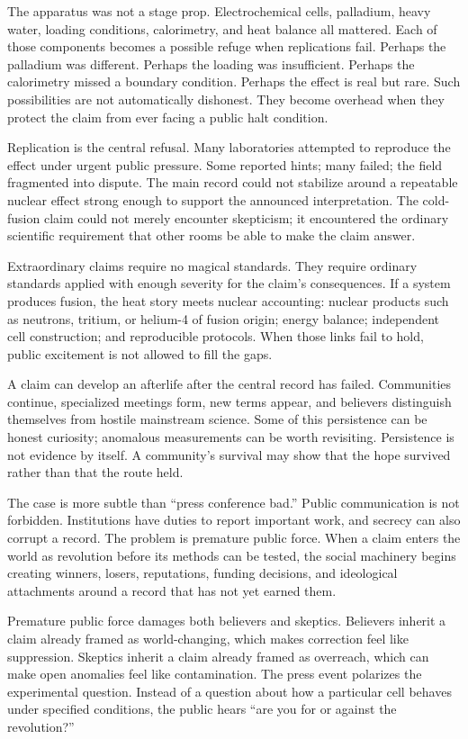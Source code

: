 The apparatus was not a stage prop. Electrochemical cells, palladium,
heavy water, loading conditions, calorimetry, and heat balance all
mattered. Each of those components becomes a possible refuge when
replications fail. Perhaps the palladium was different. Perhaps the
loading was insufficient. Perhaps the calorimetry missed a boundary
condition. Perhaps the effect is real but rare. Such possibilities are
not automatically dishonest. They become overhead when they protect the
claim from ever facing a public halt condition.

Replication is the central refusal. Many laboratories attempted to
reproduce the effect under urgent public pressure. Some reported hints;
many failed; the field fragmented into dispute. The main record could
not stabilize around a repeatable nuclear effect strong enough to support
the announced interpretation. The cold-fusion claim could not merely
encounter skepticism; it encountered the ordinary scientific requirement
that other rooms be able to make the claim answer.

Extraordinary claims require no magical standards. They require ordinary
standards applied with enough severity for the claim's consequences. If a
system produces fusion, the heat story meets nuclear accounting:
nuclear products such as neutrons, tritium, or helium-4 of fusion origin;
energy balance; independent cell construction; and reproducible
protocols. When those links fail to hold, public excitement is not
allowed to fill the gaps.

A claim can develop an afterlife after the central record has failed.
Communities continue, specialized meetings form, new terms appear, and
believers distinguish themselves from hostile mainstream science. Some of
this persistence can be honest curiosity; anomalous measurements can be
worth revisiting. Persistence is not evidence by itself. A community's
survival may show that the hope survived rather than that the route
held.

The case is more subtle than ``press conference bad.'' Public
communication is not forbidden. Institutions have duties to report
important work, and secrecy can also corrupt a record. The problem is
premature public force. When a claim enters the world as revolution before
its methods can be tested, the social machinery begins creating winners,
losers, reputations, funding decisions, and ideological attachments
around a record that has not yet earned them.

Premature public force damages both believers and skeptics. Believers
inherit a claim already framed as world-changing, which makes correction
feel like suppression. Skeptics inherit a claim already framed as
overreach, which can make open anomalies feel like contamination. The
press event polarizes the experimental question. Instead of a question
about how a particular cell behaves under specified conditions, the
public hears ``are you for or against the revolution?''

